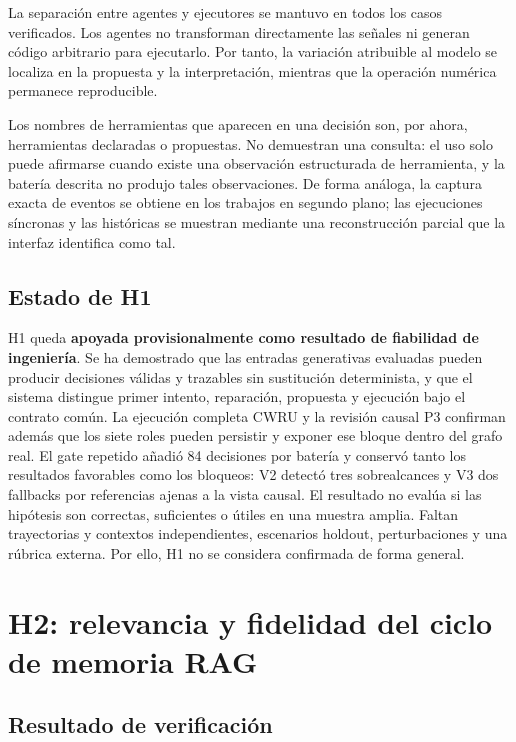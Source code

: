 La separación entre agentes y ejecutores se mantuvo en todos los casos
verificados. Los agentes no transforman directamente las señales ni generan
código arbitrario para ejecutarlo. Por tanto, la variación atribuible al modelo
se localiza en la propuesta y la interpretación, mientras que la operación
numérica permanece reproducible.

Los nombres de herramientas que aparecen en una decisión son, por ahora,
herramientas declaradas o propuestas. No demuestran una consulta: el uso solo
puede afirmarse cuando existe una observación estructurada de herramienta, y la
batería descrita no produjo tales observaciones. De forma análoga, la captura
exacta de eventos se obtiene en los trabajos en segundo plano; las ejecuciones
síncronas y las históricas se muestran mediante una reconstrucción parcial que
la interfaz identifica como tal.

\subsection{Estado de H1}

H1 queda \textbf{apoyada provisionalmente como resultado de fiabilidad de
ingeniería}. Se ha demostrado que las entradas generativas evaluadas pueden
producir decisiones válidas y trazables sin sustitución determinista, y que el
sistema distingue primer intento, reparación, propuesta y ejecución bajo el
contrato común. La ejecución completa CWRU y la revisión causal P3 confirman
además que los siete roles pueden persistir y exponer ese bloque dentro del
grafo real. El gate repetido añadió 84 decisiones por batería y conservó tanto
los resultados favorables como los bloqueos: V2 detectó tres sobrealcances y V3
dos fallbacks por referencias ajenas a la vista causal. El resultado no evalúa
si las hipótesis son correctas, suficientes o útiles en una muestra amplia.
Faltan trayectorias y contextos independientes, escenarios holdout,
perturbaciones y una rúbrica externa. Por ello, H1 no se considera confirmada de
forma general.

\section{H2: relevancia y fidelidad del ciclo de memoria RAG}

\subsection{Resultado de verificación}

